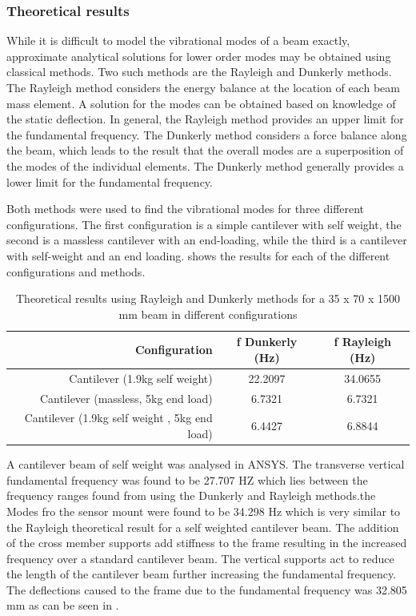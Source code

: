 \documentclass[main.tex]{subfiles}
\begin{document}
\subsubsection{Theoretical results}
While it is difficult to model the vibrational modes of a beam exactly, approximate analytical solutions for lower order modes may be obtained using classical methods. Two such methods are the Rayleigh and Dunkerly methods. The Rayleigh method considers the energy balance at the location of each beam mass element. A solution for the modes can be obtained based on knowledge of the static deflection. In general, the Rayleigh method provides an upper limit for the fundamental frequency. The Dunkerly method considers a force balance along the beam, which leads to the result that the overall modes are a superposition of the modes of the individual elements. The Dunkerly method generally provides a lower limit for the fundamental frequency.

Both methods were used to find the vibrational modes for three different configurations. The first configuration is a simple cantilever with self weight, the second is a massless cantilever with an end-loading, while the third is a cantilever with self-weight and an end loading.   shows the results for each of the different configurations and methods.



\begin{table} [ht]
\centering
\caption{Theoretical results using Rayleigh and Dunkerly methods for a 35 x 70 x 1500 mm beam in different configurations }
\begin{tabular} {r | c c}
Configuration & f Dunkerly (Hz) & f Rayleigh (Hz)  \\ \hline
Cantilever (1.9kg self weight) & 22.2097 & 34.0655  \\
Cantilever (massless, 5kg end load) & 6.7321 & 6.7321 \\
Cantilever (1.9kg self weight , 5kg end load) & 6.4427 & 6.8844 \\
\end{tabular}
\end{table}

A cantilever beam of self weight was analysed in ANSYS. The transverse vertical fundamental frequency was found to be 27.707 HZ which lies between the frequency ranges found from using the Dunkerly and Rayleigh methods.the Modes fro the sensor mount were found to be 34.298 Hz which is very similar to the Rayleigh theoretical result for a self weighted cantilever beam. The addition of the cross member supports add stiffness to the frame resulting in the increased frequency over a standard cantilever beam. The vertical supports act to reduce the length of the cantilever beam further increasing the fundamental frequency. The deflections caused to the frame due to the fundamental frequency was 32.805 mm as can be seen in . 
\end{document}
